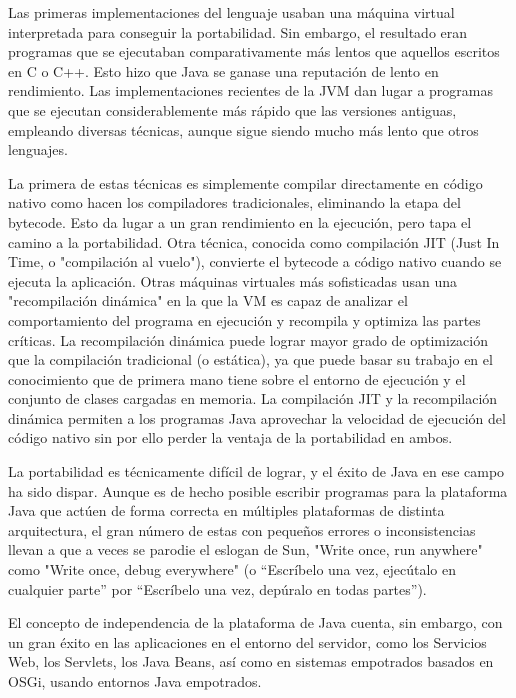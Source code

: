 \documentclass[11pt,a4paper]{book}
\begin{document}
	\bigskip
							Las primeras implementaciones del lenguaje usaban una máquina virtual interpretada para conseguir la portabilidad. Sin embargo, el resultado eran programas que se ejecutaban comparativamente más lentos que aquellos escritos en C o C++. Esto hizo que Java se ganase una reputación de lento en rendimiento. Las implementaciones recientes de la JVM dan lugar a programas que se ejecutan considerablemente más rápido que las versiones antiguas, empleando diversas técnicas, aunque sigue siendo mucho más lento que otros lenguajes.
	\bigskip
							
	\bigskip
							La primera de estas técnicas es simplemente compilar directamente en código nativo como hacen los compiladores tradicionales, eliminando la etapa del bytecode. Esto da lugar a un gran rendimiento en la ejecución, pero tapa el camino a la portabilidad. Otra técnica, conocida como compilación JIT (Just In Time, o "compilación al vuelo"), convierte el bytecode a código nativo cuando se ejecuta la aplicación. Otras máquinas virtuales más sofisticadas usan una "recompilación dinámica" en la que la VM es capaz de analizar el comportamiento del programa en ejecución y recompila y optimiza las partes críticas. La recompilación dinámica puede lograr mayor grado de optimización que la compilación tradicional (o estática), ya que puede basar su trabajo en el conocimiento que de primera mano tiene sobre el entorno de ejecución y el conjunto de clases cargadas en memoria. La compilación JIT y la recompilación dinámica permiten a los programas Java aprovechar la velocidad de ejecución del código nativo sin por ello perder la ventaja de la portabilidad en ambos.
	\bigskip
							
	\bigskip
							La portabilidad es técnicamente difícil de lograr, y el éxito de Java en ese campo ha sido dispar. Aunque es de hecho posible escribir programas para la plataforma Java que actúen de forma correcta en múltiples plataformas de distinta arquitectura, el gran número de estas con pequeños errores o inconsistencias llevan a que a veces se parodie el eslogan de Sun, "Write once, run anywhere" como "Write once, debug everywhere" (o “Escríbelo una vez, ejecútalo en cualquier parte” por “Escríbelo una vez, depúralo en todas partes”).
	\bigskip
							
	\bigskip
							El concepto de independencia de la plataforma de Java cuenta, sin embargo, con un gran éxito en las aplicaciones en el entorno del servidor, como los Servicios Web, los Servlets, los Java Beans, así como en sistemas empotrados basados en OSGi, usando entornos Java empotrados.
	\bigskip
							
\end{document}
